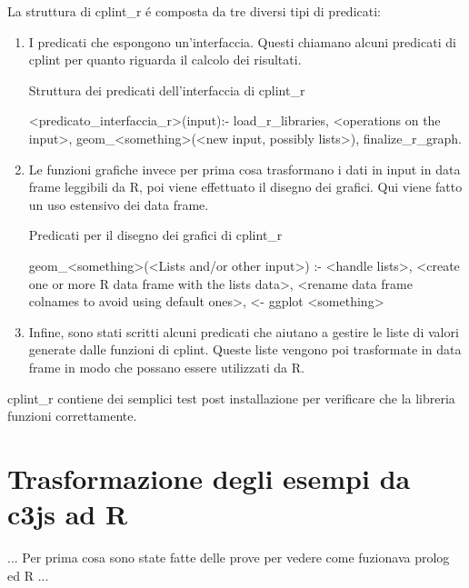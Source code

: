 \documentclass[10pt,titlepage,twoside,a4paper]{report}
\newenvironment{code}{\singlespacing\captionsetup{type=listing}}{}
\begin{document}
La struttura di cplint\_r \'e composta da tre diversi tipi di predicati:
\begin{enumerate}
    \item I predicati che espongono un'interfaccia. Questi chiamano alcuni 
          predicati di cplint per quanto riguarda il calcolo dei risultati.

        \begin{code}
            \caption{Struttura dei predicati dell'interfaccia di cplint\_r}
            \begin{prologcode*}{}
<predicato_interfaccia_r>(input):-
    load_r_libraries,
    <operations on the input>,
    geom_<something>(<new input, possibly lists>),
    finalize_r_graph.
            \end{prologcode*}
        \end{code}
    \item Le funzioni grafiche invece per prima cosa trasformano i dati in 
          input in data frame leggibili da R, poi viene effettuato il disegno 
          dei grafici. Qui viene fatto un uso estensivo dei data frame.

    \begin{code}
        \caption{Predicati per il disegno dei grafici di cplint\_r}
        \begin{prologcode*}{}
geom_<something>(<Lists and/or other input>) :-
    <handle lists>,
    <create one or more R data frame with the lists data>,
    <rename data frame colnames to avoid using default ones>,
    <- ggplot <something>
        \end{prologcode*}
    \end{code}
    \item Infine, sono stati scritti alcuni predicati che aiutano a gestire le 
          liste di valori generate dalle funzioni di cplint. Queste liste 
          vengono poi trasformate in data frame in modo che possano 
          essere utilizzati da R.
\end{enumerate}

cplint\_r contiene dei semplici test post installazione per verificare che la 
libreria funzioni correttamente.




\chapter{Trasformazione degli esempi da c3js ad R} \label{ch:trasformazione-
degli-esempi-da-c3js-ad-r}
... Per prima cosa sono state fatte delle prove per vedere come fuzionava 
prolog ed R ...
\end{document}
